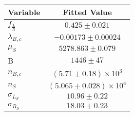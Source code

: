 \begin{tabular}[t]{lc}
\hline
Variable &Fitted Value\\
\hline\hline
$f_{\frac{L}{R}}$&$0.425\pm0.021$\\
\hline
$\lambda_{B,c}$&$-0.00173\pm0.00024$\\
\hline
$\mu_S$&$5278.863\pm0.079$\\
\hline
B&$1446\pm47$\\
\hline
$n_{B,c}$&$(5.71\pm0.18)\times 10^3$\\
\hline
$n_S$&$(5.065\pm0.028)\times 10^4$\\
\hline
$\sigma_{L_S}$&$10.96\pm0.22$\\
\hline
$\sigma_{R_S}$&$18.03\pm0.23$\\
\hline
\end{tabular}